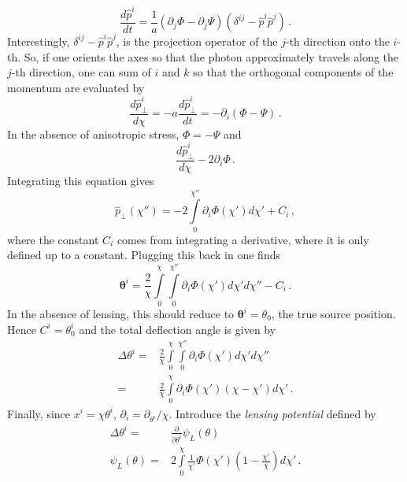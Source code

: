 \begin{equation}
	\frac{d\hat{p}^i}{dt} = \frac{1}{a}\left( \partial_j\Phi - \partial_j\Psi \right)(\delta^{ij}-\hat{p}^i\hat{p}^j)\,.
\end{equation}
Interestingly, $\delta^{ij}-\hat p^i \hat p^j$, is the projection operator of the $j$-th direction onto the $i$-th. So, if one orients the axes so that the photon approximately travels along the $j$-th direction, one can sum of $i$ and $k$ so that the orthogonal components of the momentum are evaluated by
\begin{equation}
	\frac{d\hat{p}^i_\perp}{d\chi} = - a \frac{d\hat{p}^i_\perp}{dt} = -\partial_i(\Phi-\Psi)\,.
\end{equation}
In the absence of anisotropic stress, $\Phi=-\Psi$ and 
\begin{equation}
	\frac{d\hat{p}^i_\perp}{d\chi} -2\partial_i\Phi\,.
\end{equation}
Integrating this equation gives
\begin{equation}
	\hat p_\perp (\chi'') = -2\int\limits_0^{\chi''}\partial_i\Phi(\chi') d\chi' + C_i\,,
\end{equation}
where the constant $C_i$ comes from integrating a derivative, where it is only defined up to a constant. Plugging this back in one finds
\begin{equation}
	\mathbf{\theta}^i = \frac{2}{\chi}\int\limits_0^\chi \int\limits_0^{\chi''}\partial_i\Phi(\chi') d\chi' d\chi'' - C_i\,.
\end{equation}
In the absence of lensing, this should reduce to $\mathbf{\theta}^i = \theta_0$, the true source position. Hence $C^i=\theta^i_0$ and the total deflection angle is given by
\begin{equation}
	\begin{split}
		\Delta\theta^i =& \frac{2}{\chi}\int\limits_0^\chi \int\limits_0^{\chi''}\partial_i\Phi(\chi') d\chi' d\chi''\\
		=& \frac{2}{\chi}\int\limits_0^\chi \partial_i\Phi(\chi') (\chi-\chi') d\chi'\,.
	\end{split}
\end{equation}
Finally, since $x^i=\chi\theta^i$, $\partial_i = \partial_{\theta^i}/\chi$. Introduce the \textit{lensing potential} defined by
\begin{equation}
	\begin{split}
		\Delta\theta^i =& \frac{\partial}{\partial \theta^i}\psi_L(\theta) \\
		\psi_L(\theta) =& 2\int\limits_0^\chi \frac{1}{\chi'}\Phi(\chi') \left(1-\frac{\chi'}{\chi}\right) d\chi'\,.
	\end{split}
\end{equation}
